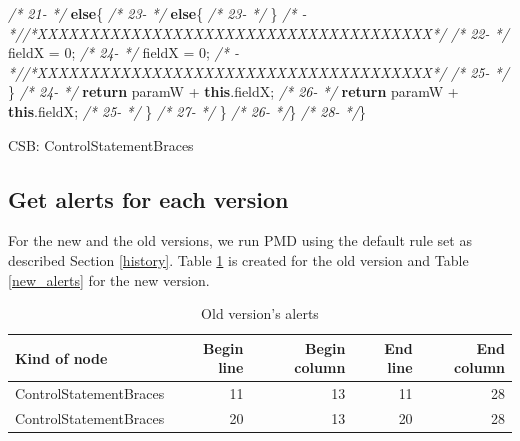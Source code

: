 \documentclass[
]{article}
\newenvironment{Shaded}{\begin{snugshade}}{\end{snugshade}}
\newcommand{\CommentTok}[1]{\textcolor[rgb]{0.56,0.35,0.01}{\textit{#1}}}
\newcommand{\DecValTok}[1]{\textcolor[rgb]{0.00,0.00,0.81}{#1}}
\newcommand{\FunctionTok}[1]{\textcolor[rgb]{0.00,0.00,0.00}{#1}}
\newcommand{\KeywordTok}[1]{\textcolor[rgb]{0.13,0.29,0.53}{\textbf{#1}}}
\newcommand{\NormalTok}[1]{#1}
\begin{document}
\begin{Shaded}
\begin{Highlighting}[]
\CommentTok{/* 21{-}   */}        \KeywordTok{else}\NormalTok{\{                                            }\CommentTok{/* 23{-}   */}        \KeywordTok{else}\NormalTok{\{                                            }
\CommentTok{/* 23{-}   */}\NormalTok{     \}                                                        }\CommentTok{/*   {-}   *//*XXXXXXXXXXXXXXXXXXXXXXXXXXXXXXXXXXXXXX*/}               
\CommentTok{/* 22{-}   */}\NormalTok{            fieldX = }\DecValTok{0}\NormalTok{;                                  }\CommentTok{/* 24{-}   */}\NormalTok{            fieldX = }\DecValTok{0}\NormalTok{;                                  }
\CommentTok{/*   {-}   *//*XXXXXXXXXXXXXXXXXXXXXXXXXXXXXXXXXXXXXX*/}               \CommentTok{/* 25{-}   */}\NormalTok{        \}                                                }
\CommentTok{/* 24{-}   */}        \KeywordTok{return}\NormalTok{ paramW + }\KeywordTok{this}\NormalTok{.}\FunctionTok{fieldX}\NormalTok{;                     }\CommentTok{/* 26{-}   */}        \KeywordTok{return}\NormalTok{ paramW + }\KeywordTok{this}\NormalTok{.}\FunctionTok{fieldX}\NormalTok{;                     }
\CommentTok{/* 25{-}   */}\NormalTok{     \}                                                   }\CommentTok{/* 27{-}   */}\NormalTok{     \}                                                   }
\CommentTok{/* 26{-}   */}\NormalTok{\}                                                        }\CommentTok{/* 28{-}   */}\NormalTok{\}                                                        }


\NormalTok{CSB: ControlStatementBraces}
\end{Highlighting}
\end{Shaded}

\normalsize

\subsection{Get alerts for each version}

For the new and the old versions, we run PMD using the default rule set
as described Section \ref{history}. Table \ref{old_alerts} is created
for the old version and Table \ref{new_alerts} for the new version.

\small

\begin{table}[H]

\caption{\label{tab:unnamed-chunk-3}Old version's alerts\label{old_alerts}}
\centering
\begin{tabular}[t]{l|r|r|r|r}
\hline
Kind of node & Begin line & Begin column & End line & End column\\
\hline
\rowcolor{gray!6}  ControlStatementBraces & 11 & 13 & 11 & 28\\
\hline
ControlStatementBraces & 20 & 13 & 20 & 28\\
\hline
\end{tabular}
\end{table}
\end{document}
